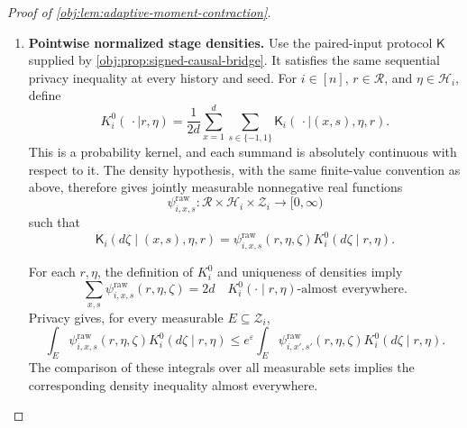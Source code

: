 \begin{proof}[Proof of \cref{obj:lem:adaptive-moment-contraction}]
\begin{enumerate}
Now define, on the full domain
\(\mathbb R^d\times\mathcal R\times\mathcal Z\),
\[
p^Q(\theta,r)(\mathbf z)
=
\sum_{\mathbf o\in\mathcal O_d^n}
 \mathsf{mass}^{(n)}_\theta(\mathbf o)\,
 \varphi_{\mathbf o}(r,\mathbf z).
\]
This is jointly measurable and real valued. On the parameter cube its summands are nonnegative, and finite summation of the density identities gives
\[
\mathsf{Prob}^Q_{\theta,r}(d\mathbf z)
=p^Q(\theta,r)(\mathbf z)\Lambda_r^Q(d\mathbf z).
\]

For \(j\in[d]\) and \(u\in\mathbb R\), define coordinate replacement by
\[
\theta^{[j:u]}_x
=
\begin{cases}
u,&x=j,\\
\theta_x,&x\ne j.
\end{cases}
\]
Each observed-record mass obeys
\[
\mathsf{mass}^{(1)}_{\theta^{[j:u]}}(o)
=
\mathsf{mass}^{(1)}_{\theta^{[j:0]}}(o)
+\frac{\mathbf1_{\{j_o=j\}}\mathsf{sgn}_{\mathrm{obs}}(o)}{4d}\,u.
\]
Thus each sample mass, and hence \(p^Q\), is a polynomial of degree at most \(n\) in each coordinate on all of \(\mathbb R\). Its coordinate coefficients are finite linear combinations of the integrable functions \(\varphi_{\mathbf o}(r,\cdot)\), so those coefficients and all coordinate derivatives are integrable against \(\Lambda_r^Q\).

\item \textbf{Pointwise normalized stage densities.}
Use the paired-input protocol \(\mathsf K\) supplied by
\cref{obj:prop:signed-causal-bridge}. It satisfies the same sequential privacy inequality at every history and seed. For
\(i\in[n]\), \(r\in\mathcal R\), and \(\eta\in\mathcal H_i\), define
\[
K_i^0(\,\cdot\mid r,\eta)
=\frac1{2d}\sum_{x=1}^d\sum_{s\in\{-1,1\}}
 \mathsf K_i(\,\cdot\mid(x,s),\eta,r).
\]
This is a probability kernel, and each summand is absolutely continuous with respect to it. The density hypothesis, with the same finite-value convention as above, therefore gives jointly measurable nonnegative real functions
\[
\psi^{\mathrm{raw}}_{i,x,s}:
\mathcal R\times\mathcal H_i\times\mathcal Z_i\longrightarrow[0,\infty)
\]
such that
\[
\mathsf K_i(d\zeta\mid(x,s),\eta,r)
=\psi^{\mathrm{raw}}_{i,x,s}(r,\eta,\zeta)
 K_i^0(d\zeta\mid r,\eta).
\]

For each \(r,\eta\), the definition of \(K_i^0\) and uniqueness of densities imply
\[
\sum_{x,s}\psi^{\mathrm{raw}}_{i,x,s}(r,\eta,\zeta)=2d
\quad
K_i^0(\cdot\mid r,\eta)\text{-almost everywhere}.
\]
Privacy gives, for every measurable \(E\subseteq\mathcal Z_i\),
\[
\int_E\psi^{\mathrm{raw}}_{i,x,s}(r,\eta,\zeta)
 K_i^0(d\zeta\mid r,\eta)
\le
e^\varepsilon
\int_E\psi^{\mathrm{raw}}_{i,x',s'}(r,\eta,\zeta)
 K_i^0(d\zeta\mid r,\eta).
\]
The comparison of these integrals over all measurable sets implies the corresponding density inequality almost everywhere.


\end{enumerate}
\end{proof}
